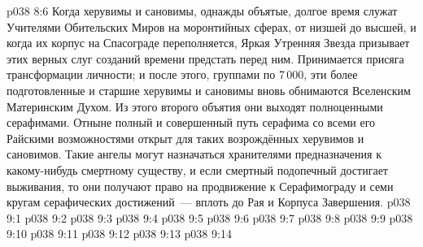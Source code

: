 \vs p038 8:6 Когда херувимы и сановимы, однажды объятые, долгое время служат Учителями Обительских Миров на моронтийных сферах, от низшей до высшей, и когда их корпус на Спасограде переполняется, Яркая Утренняя Звезда призывает этих верных слуг созданий времени предстать перед ним. Принимается присяга трансформации личности; и после этого, группами по 7\,000, эти более подготовленные и старшие херувимы и сановимы вновь обнимаются Вселенским Материнским Духом. Из этого второго объятия они выходят полноценными серафимами. Отныне полный и совершенный путь серафима со всеми его Райскими возможностями открыт для таких возрождённых херувимов и сановимов. Такие ангелы могут назначаться хранителями предназначения к какому\hyp{}нибудь смертному существу, и если смертный подопечный достигает выживания, то они получают право на продвижение к Серафимограду и семи кругам серафических достижений~--- вплоть до Рая и Корпуса Завершения.
\vs p038 9:1 
\vs p038 9:2 
\vs p038 9:3 
\vs p038 9:4 
\vs p038 9:5 \pc 
\vs p038 9:6 
\vs p038 9:7 
\vs p038 9:8 
\vs p038 9:9 
\vs p038 9:10 \pc 
\vs p038 9:11 
\vs p038 9:12 
\vs p038 9:13 \pc 
\vsetoff
\vs p038 9:14 
\quizlink
